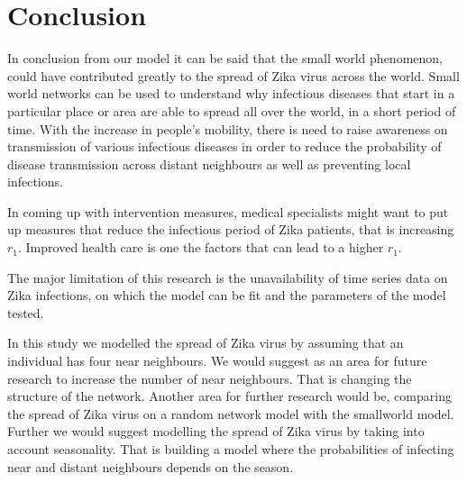 \section{Conclusion}

In conclusion from our model it can be said that the small world phenomenon, could have  contributed  greatly to the spread of Zika virus across the world. Small world networks can be used to understand why infectious diseases that start in a particular place or area are able to spread all over the world, in a short period of time. With  the increase in people's mobility, there is need to raise awareness on transmission of various infectious diseases in order to reduce the probability of disease transmission across distant
neighbours as well as preventing local infections. 

In coming up with intervention measures, medical specialists might want  to put up measures that reduce the infectious period of Zika patients, that is increasing $r_1$.  Improved health care is one the factors that can lead to  a higher $r_1$. 

The major limitation of this research is the unavailability of time series data on Zika infections, on which the model can be fit and the parameters of the model tested.

In this study we modelled the spread of Zika virus by assuming that an individual has four near neighbours. We would suggest as an area for future research to increase the number of near neighbours.
That is changing the structure of the network. Another area for further research would be, comparing the spread of Zika virus on a random network model with the smallworld model. Further we would suggest modelling the spread of Zika virus by taking into account seasonality. That is building a model where the probabilities of infecting near and distant neighbours depends on the season.

